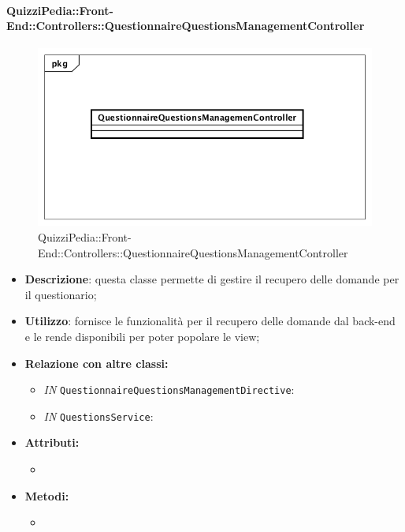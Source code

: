 \paragraph{QuizziPedia::Front-End::Controllers::QuestionnaireQuestionsManagementController}
\begin{figure}
	\centering
	\includegraphics[scale=0.45]{UML/Classi/Front-End/QuizziPedia_Front-end_Controller_QuestionnaireQuestionsManagementController.png}
	\caption{QuizziPedia::Front-End::Controllers::QuestionnaireQuestionsManagementController}
\end{figure}
\begin{itemize}
	\item \textbf{Descrizione}: questa classe permette di gestire il recupero delle domande per il questionario;
	\item \textbf{Utilizzo}: fornisce le funzionalità per il recupero delle domande dal back-end e le rende disponibili per poter popolare le view;
	\item \textbf{Relazione con altre classi:}
	\begin{itemize}
		\item \textit{IN} \texttt{QuestionnaireQuestionsManagementDirective}: 
		\item \textit{IN} \texttt{QuestionsService}: 
	\end{itemize}
	\item \textbf{Attributi:}
	\begin{itemize}
		\item 
	\end{itemize}
	\item \textbf{Metodi:}
	\begin{itemize}
		\item 
	\end{itemize}
\end{itemize}

